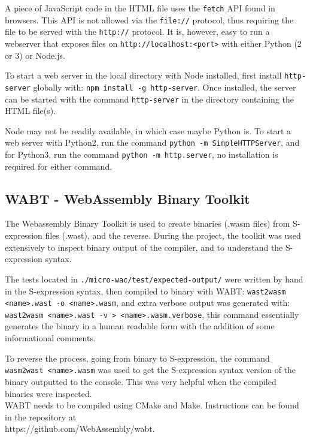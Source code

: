 \documentclass[a4paper]{article}
\begin{document}
A piece of JavaScript code in the HTML file uses the \texttt{fetch} API found in browsers. This API is not allowed via the \texttt{file://} protocol, thus requiring the file to be served with the \texttt{http://} protocol. It is, however, easy to run a webserver that exposes files on \texttt{http://localhost:<port>} with either Python (2 or 3) or Node.js.

To start a web server in the local directory with Node installed, first install \texttt{http-server} globally with: \verb$npm install -g http-server$. Once installed, the server can be started with the command \texttt{http-server} in the directory containing the HTML file(s).

Node may not be readily available, in which case maybe Python is. To start a web server with Python2, run the command \texttt{python -m SimpleHTTPServer}, and for Python3, run the command \texttt{python -m http.server}, no installation is required for either command.

\subsection{WABT - WebAssembly Binary Toolkit}
\label{sec:peripherals:wabt}
The Webassembly Binary Toolkit is used to create binaries (.wasm files) from S-expression files (.wast), and the reverse. During the project, the toolkit was used extensively to inspect binary output of the compiler, and to understand the S-expression syntax.

The tests located in \texttt{./micro-wac/test/expected-output/} were written by hand in the S-expression syntax, then compiled to binary with WABT: \texttt{wast2wasm <name>.wast -o <name>.wasm}, and extra verbose output was generated with: \texttt{wast2wasm <name>.wast -v > <name>.wasm.verbose}, this command essentially generates the binary in a human readable form with the addition of some informational comments.

To reverse the process, going from binary to S-expression, the command \texttt{wasm2wast <name>.wasm} was used to get the S-expression syntax version of the binary outputted to the console. This was very helpful when the compiled binaries were inspected.\\

\noindent WABT needs to be compiled using CMake and Make. Instructions can be found in the repository at\\https://github.com/WebAssembly/wabt.
\end{document}
